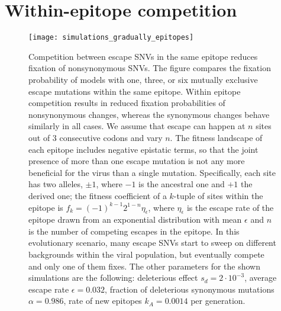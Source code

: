 \newpage
\section{Within-epitope competition}
\begin{figure}[h]
\begin{center}
\texttt{[image: simulations\_gradually\_epitopes]}
\caption{
Competition between escape SNVs in the same epitope reduces fixation of
nonsynonymous SNVs. The figure compares the fixation probability of models
with one, three, or six mutually exclusive escape mutations within the
same epitope. Within epitope competition results in reduced fixation
probabilities of nonsynonymous changes, whereas the synonymous changes behave 
similarly in all cases. We assume that escape can happen at $n$ sites out of 3
consecutive codons and vary $n$.
The fitness landscape of each epitope includes negative epistatic terms, so that
the joint presence of more than one escape mutation is not any more beneficial
for the virus than a single mutation. Specifically, each site has two alleles,
$\pm 1$, where $-1$ is the ancestral one and $+1$ the derived one; the fitness
coefficient of a $k$-tuple of sites within the epitope is $f_k = (-1)^{k-1}
2^{1-n}\eta_\epsilon $, where $\eta_\epsilon$ is the escape rate of the epitope
drawn from an exponential distribution with mean $\epsilon$ and 
$n$ is the number of competing escapes in the epitope. 
In this evolutionary scenario, many escape SNVs start to sweep on different backgrounds within the viral population, but eventually
compete and only one of them fixes. The other parameters for the shown simulations are
the following: deleterious effect $s_d = 2 \cdot 10^{-3}$, average escape rate
$\epsilon = 0.032$, fraction of deleterious synonymous mutations $\alpha = 0.986$, rate of new epitopes
$k_A=0.0014$ per generation.
}
\label{fig:wec}
\end{center}
\end{figure}

